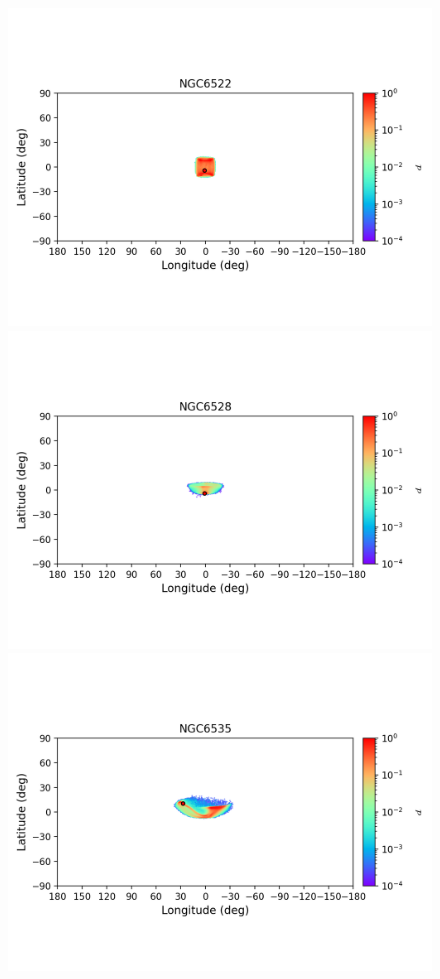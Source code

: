 \begin{figure}
        \includegraphics[clip=true, trim = 0mm 20mm 0mm 10mm, width=1\columnwidth]{images/error_plots_NGC6522.png}
        \includegraphics[clip=true, trim = 0mm 20mm 0mm 10mm, width=1\columnwidth]{images/error_plots_NGC6528.png}
        \includegraphics[clip=true, trim = 0mm 20mm 0mm 10mm, width=1\columnwidth]{images/error_plots_NGC6535.png}

\end{figure}
